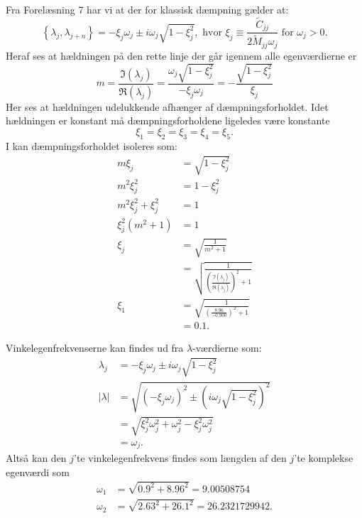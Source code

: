 \begin{derivation}
  Fra Forelæsning 7 har vi at der for klassisk dæmpning gælder at:
  \[ 
  \left\{ \lambda_j, \lambda_{j+n} \right\} = - \xi_j \omega_j \pm i \omega_j \sqrt{1 - \xi_j^2}, \text{ hvor } \xi_j \equiv \frac{\tilde{C}_{jj}}{2 \tilde{M}_{jj} \omega_j} \text{ for } \omega_j > 0
  .\]
  Heraf ses at hældningen på den rette linje der går igennem alle egenværdierne er
  \begin{equation} \label{eq:hældning}
    m = \frac{\Im(\lambda_j)}{\Re(\lambda_j)} = \frac{\omega_j \sqrt{1 - \xi_j^2}}{- \xi_j \omega_j} = - \frac{\sqrt{1- \xi^2_j}}{\xi_j}
  \end{equation}
  Her ses at hældningen udelukkende afhænger af dæmpningsforholdet.
  Idet hældningen er konstant må dæmpningsforholdene ligeledes være konstante
  \[ 
  \xi_1 = \xi_2 = \xi_3 = \xi_4 = \xi_5
  .\]
  I  kan dæmpningsforholdet isoleres som:
  \begin{align*}
    m \xi_j &= \sqrt{1 - \xi_j^2} \\
    m^2 \xi_j^2 &= 1 - \xi_j^2 \\
    m^2 \xi_j^2 + \xi_j^2 &= 1 \\
    \xi_j^2 \left( m^2 + 1 \right) &= 1 \\
    \xi_j &= \sqrt{\frac{1}{m^2 + 1}} \\
       &= \sqrt{\frac{1}{\left( \frac{\Im(\lambda_j)}{\Re(\lambda_j)} \right)^2 + 1}} \\
    \xi_1 &= \sqrt{\frac{1}{\left( \frac{\num{8,96}}{\num{-0,900}} \right)^2 +1}} \\
          &= \num{0,1}
  .\end{align*}

  Vinkelegenfrekvenserne kan findes ud fra $\lambda$-værdierne som:
  \begin{align*}
    \lambda_j &= - \xi_j \omega_j \pm i \omega_j \sqrt{1 - \xi^2_j} \\
    |\lambda| &= \sqrt{\left( -\xi_j \omega_j \right)^2 \pm \left( i \omega_j \sqrt{1 - \xi^2_j} \right)^2} \\
        &= \sqrt{\xi_j^2 \omega_j^2 + \omega_j^2 - \xi_j^2 \omega_j^2} \\
        &= \omega_j
  .\end{align*}
  Altså kan den $j$'te vinkelegenfrekvens findes som længden af den $j$'te komplekse egenværdi som
  \begin{align*}
    \omega_1 &= \sqrt{\num{0,9}^2 + \num{8,96}^2} = \num{9,00508754} \\
    \omega_2 &= \sqrt{\num{2,63}^2 + \num{26,1}^2} = \num{26,2321729942} 
  .\end{align*}


\end{derivation}
